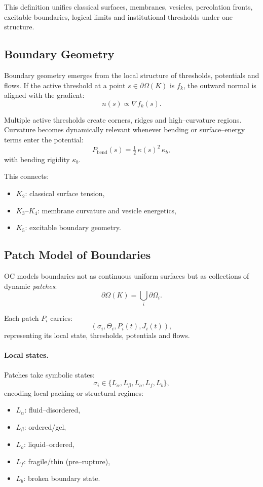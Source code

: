 This definition unifies classical surfaces, membranes, vesicles,
percolation fronts, excitable boundaries, logical limits and institutional
thresholds under one structure.

\subsection{Boundary Geometry}

Boundary geometry emerges from the local structure of thresholds, potentials
and flows.  
If the active threshold at a point \(s \in \partial\Omega(K)\) is \(f_k\), the
outward normal is aligned with the gradient:
\[
  n(s) \propto \nabla f_k(s).
\]

Multiple active thresholds create corners, ridges and high–curvature regions.
Curvature becomes dynamically relevant whenever bending or surface–energy
terms enter the potential:
\[
  P_{\mathrm{bend}}(s) = \tfrac{1}{2}\,\kappa(s)^2\,\kappa_b,
\]
with bending rigidity \(\kappa_b\).

This connects:
\begin{itemize}
    \item \(K_2\): classical surface tension,
    \item \(K_3\)–\(K_4\): membrane curvature and vesicle energetics,
    \item \(K_5\): excitable boundary geometry.
\end{itemize}

\subsection{Patch Model of Boundaries}

OC models boundaries not as continuous uniform surfaces but as collections of
dynamic \emph{patches}:
\[
  \partial\Omega(K) = \bigcup_i \partial\Omega_i.
\]

Each patch \(P_i\) carries:
\[
  (\sigma_i,\Theta_i,P_i(t),J_i(t)),
\]
representing its local state, thresholds, potentials and flows.

\paragraph{Local states.}
Patches take symbolic states:
\[
  \sigma_i \in \{L_\alpha, L_\beta, L_o, L_f, L_b\},
\]
encoding local packing or structural regimes:
\begin{itemize}
    \item \(L_\alpha\): fluid–disordered,
    \item \(L_\beta\): ordered/gel,
    \item \(L_o\): liquid–ordered,
    \item \(L_f\): fragile/thin (pre–rupture),
    \item \(L_b\): broken boundary state.
\end{itemize}

